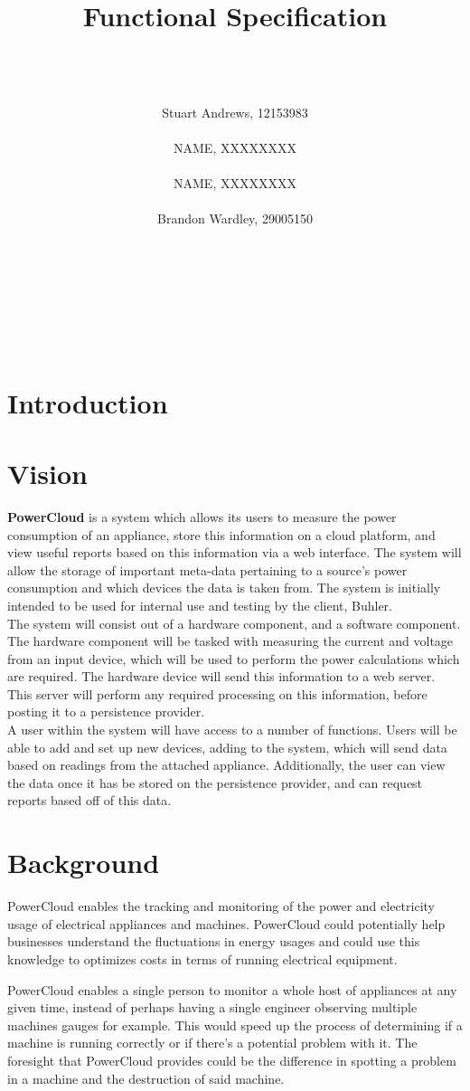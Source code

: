 \documentclass{article}
\title{Functional Specification}
\author
{  
	\\\\\\
	Stuart Andrews, 12153983 
	\\\\
	NAME, XXXXXXXX
	\\\\
	NAME, XXXXXXXX 
	\\\\
	Brandon Wardley, 29005150 
	\\\\\\\\\\\\\\
}
\begin{document}
	\maketitle
	\thispagestyle{empty}
	\newpage
	\tableofcontents
	\newpage
	
	\section{Introduction}
	\newpage
	\section{Vision}
	\textbf{PowerCloud} is a system which allows its users to measure the power consumption of an appliance, store this information on a cloud platform, and view useful reports based on this information via a web interface. The system will allow the storage of important meta-data pertaining to a source's power consumption and which devices the data is taken from. The system is initially intended to be used for internal use and testing by the client, Buhler.\\
	
	The system will consist out of a hardware component, and a software component. The hardware component will be tasked with measuring the current and voltage from an input device, which will be used to perform the power calculations which are required. The hardware device will send this information to a web server. This server will perform any required processing on this information, before posting it to a persistence provider.\\
	
	A user within the system will have access to a number of functions. Users will be able to add and set up new devices, adding to the system, which will send data based on readings from the attached appliance. Additionally, the user can view the data once it has be stored on the persistence provider, and can request reports based off of this data.
	\newpage
	\section{Background}
	PowerCloud enables the tracking and monitoring of the power and electricity 
	usage of electrical appliances and machines. PowerCloud could potentially help 
	businesses understand the fluctuations in energy usages and could use this 
	knowledge to optimizes costs in terms of running electrical equipment.
	
	PowerCloud enables a single person to monitor a whole host of appliances at any 
	given time, instead of perhaps having a single engineer observing multiple 
	machines gauges for example. This would speed up the process of determining if 
	a machine is running correctly or if there's a potential problem with it. The 
	foresight that PowerCloud provides could be the difference in spotting a 
	problem in a machine and the destruction of said machine.
	\newpage
\end{document}
